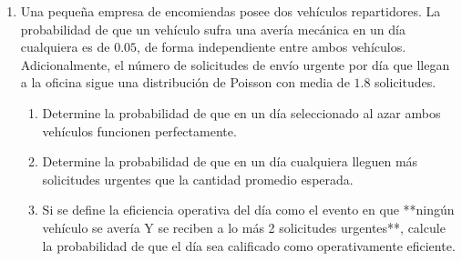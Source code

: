\documentclass[letterpaper,12pt,spanish]{article}
\newcounter{defi}[section]\setcounter{defi}{0}
\begin{document}
\begin{enumerate}[label=\textbf{\arabic*.}]
    \vspace{0.3cm}

    \item Una pequeña empresa de encomiendas posee dos vehículos repartidores. La probabilidad de que un vehículo sufra una avería mecánica en un día cualquiera es de $0.05$, de forma independiente entre ambos vehículos. Adicionalmente, el número de solicitudes de envío urgente por día que llegan a la oficina sigue una distribución de Poisson con media de $1.8$ solicitudes.
    \begin{enumerate}[label=\alph*)]
        \item Determine la probabilidad de que en un día seleccionado al azar ambos vehículos funcionen perfectamente.
        \item Determine la probabilidad de que en un día cualquiera lleguen más solicitudes urgentes que la cantidad promedio esperada.
        \item Si se define la eficiencia operativa del día como el evento en que **ningún vehículo se avería Y se reciben a lo más 2 solicitudes urgentes**, calcule la probabilidad de que el día sea calificado como operativamente eficiente.
    \end{enumerate}

\end{enumerate}
\end{document}
